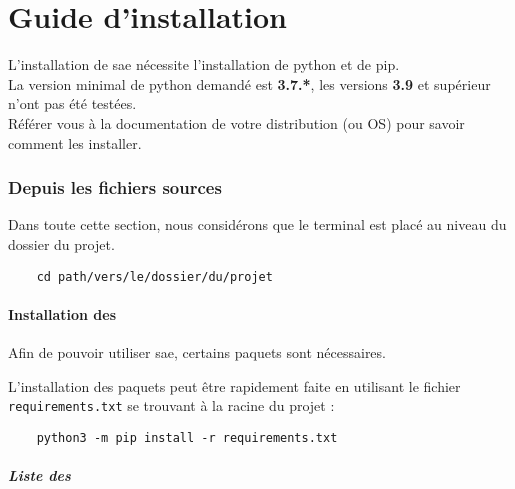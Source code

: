 \part{Guide d'installation}

L'installation de \gls{sae} nécessite l'installation de \gls{python} et de \gls{pip}.\\
La version minimal de \gls{python} demandé est \textbf{3.7.*}, les versions \textbf{3.9} et supérieur n'ont pas été
testées.\\
Référer vous à la documentation de votre distribution (ou OS) pour savoir comment les installer.

\section{Depuis les fichiers sources}

Dans toute cette section, nous considérons que le terminal est placé au niveau du dossier du projet.

\begin{verbatim}
    cd path/vers/le/dossier/du/projet
\end{verbatim}

\subsection{Installation des }

Afin de pouvoir utiliser \gls{sae}, certains \glspl{paquet} sont nécessaires.\newline

L'installation des \glspl{paquet} peut être rapidement faite en utilisant le fichier \verb=requirements.txt= se
trouvant à la racine du projet :

\begin{verbatim}
    python3 -m pip install -r requirements.txt
\end{verbatim}

\subsubsection{Liste des }


